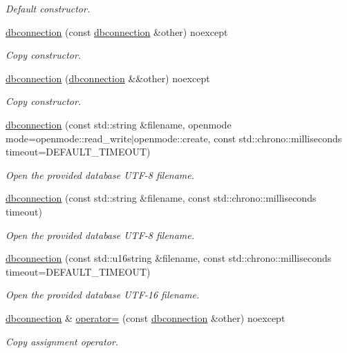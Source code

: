 \begin{DoxyCompactItemize}
\begin{DoxyCompactList}\small\item\em Default constructor. \end{DoxyCompactList}\item 
\hyperlink{a00004_a6c17517eb1631c15b64a0c54dd5355ca}{dbconnection} (const \hyperlink{a00004}{dbconnection} \&other) noexcept
\begin{DoxyCompactList}\small\item\em Copy constructor. \end{DoxyCompactList}\item 
\hyperlink{a00004_a31b78d1afbfc6147319eabb9f0e23bc5}{dbconnection} (\hyperlink{a00004}{dbconnection} \&\&other) noexcept
\begin{DoxyCompactList}\small\item\em Copy constructor. \end{DoxyCompactList}\item 
\hyperlink{a00004_a65e20f08669b49b018614cddd47efa77}{dbconnection} (const std\-::string \&filename, openmode mode=openmode\-::read\-\_\-write$\vert$openmode\-::create, const std\-::chrono\-::milliseconds timeout=D\-E\-F\-A\-U\-L\-T\-\_\-\-T\-I\-M\-E\-O\-U\-T)
\begin{DoxyCompactList}\small\item\em Open the provided database U\-T\-F-\/8 filename. \end{DoxyCompactList}\item 
\hyperlink{a00004_a4de544133c1a430855624c94986ed16c}{dbconnection} (const std\-::string \&filename, const std\-::chrono\-::milliseconds timeout)
\begin{DoxyCompactList}\small\item\em Open the provided database U\-T\-F-\/8 filename. \end{DoxyCompactList}\item 
\hyperlink{a00004_a1ac3a4126d0c5da0773f14e9ac443678}{dbconnection} (const std\-::u16string \&filename, const std\-::chrono\-::milliseconds timeout=D\-E\-F\-A\-U\-L\-T\-\_\-\-T\-I\-M\-E\-O\-U\-T)
\begin{DoxyCompactList}\small\item\em Open the provided database U\-T\-F-\/16 filename. \end{DoxyCompactList}\item 
\hyperlink{a00004}{dbconnection} \& \hyperlink{a00004_ae7c52ec41d3dfb7f4c8a521af7673bde}{operator=} (const \hyperlink{a00004}{dbconnection} \&other) noexcept
\begin{DoxyCompactList}\small\item\em Copy assignment operator. \end{DoxyCompactList}\item 

\end{DoxyCompactItemize}
